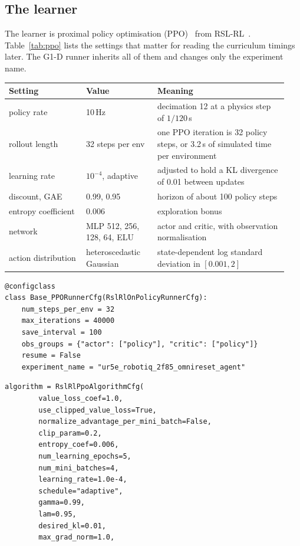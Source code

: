 \subsection{The learner}

The learner is proximal policy optimisation (PPO)~\cite{schulman2017ppo} from RSL-RL~\cite{rudin2022walk}. Table~\ref{tab:ppo} lists the settings that matter for reading the curriculum timings later. The G1-D runner inherits all of them and changes only the experiment name.

\begin{mytable}
{\small
\begin{tabular}{@{}p{0.26\linewidth}p{0.24\linewidth}p{0.44\linewidth}@{}}
\toprule Setting & Value & Meaning\\\midrule
policy rate & 10\,Hz & decimation 12 at a physics step of $1/120$\,s\\
rollout length & 32 steps per env & one PPO iteration is 32 policy steps, or 3.2\,s of simulated time per environment\\
learning rate & $10^{-4}$, adaptive & adjusted to hold a KL divergence of 0.01 between updates\\
discount, GAE & 0.99, 0.95 & horizon of about 100 policy steps\\
entropy coefficient & 0.006 & exploration bonus\\
network & MLP 512, 256, 128, 64, ELU & actor and critic, with observation normalisation\\
action distribution & heteroscedastic Gaussian & state-dependent log standard deviation in $[0.001, 2]$\\
\bottomrule
\end{tabular}}
\end{mytable}

\begin{snippetbox}[11]
\begin{lstlisting}[firstnumber=17]
@configclass
class Base_PPORunnerCfg(RslRlOnPolicyRunnerCfg):
    num_steps_per_env = 32
    max_iterations = 40000
    save_interval = 100
    obs_groups = {"actor": ["policy"], "critic": ["policy"]}
    resume = False
    experiment_name = "ur5e_robotiq_2f85_omnireset_agent"
\end{lstlisting}
\snippetelide
\begin{lstlisting}[firstnumber=47]
    algorithm = RslRlPpoAlgorithmCfg(
        value_loss_coef=1.0,
        use_clipped_value_loss=True,
        normalize_advantage_per_mini_batch=False,
        clip_param=0.2,
        entropy_coef=0.006,
        num_learning_epochs=5,
        num_mini_batches=4,
        learning_rate=1.0e-4,
        schedule="adaptive",
        gamma=0.99,
        lam=0.95,
        desired_kl=0.01,
        max_grad_norm=1.0,
\end{lstlisting}
\end{snippetbox}

